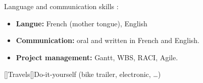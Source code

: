 \documentclass[11pt,a4paper,sans]{moderncv}        %
\newcommand{\myitem}{\textbullet}
\begin{document}
\begin{samepage}
{}%
{Language and communication skills : }%
{{%
	\begin{itemize}[label=\myitem]%
	\item \textbf{Langue: } {\small French (mother tongue),  English}%
	\item \textbf{Communication: } {\small oral and written in French and English.} %
	\item \textbf{Project management: } {\small Gantt, WBS, RACI, Agile.}%
	\end{itemize}%
}}
[\bcfleur]{Travels}[\bcvelo]{Do-it-yourself (bike trailer, electronic, …)}%
\end{samepage}%
\end{document}
